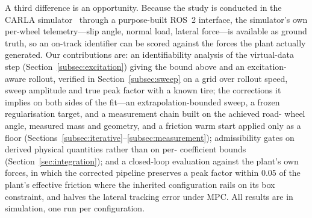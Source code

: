 A third difference is an opportunity. Because the study is conducted in the
CARLA simulator~\cite{carla2017} through a purpose-built ROS~2 interface, the
simulator's own per-wheel telemetry---slip angle, normal load, lateral
force---is available as ground truth, so an on-track identifier can be scored
against the forces the plant actually generated. Our contributions are: an identifiability analysis of the virtual-data step
(Section~\ref{subsec:excitation}) giving the bound above and an excitation-
aware rollout, verified in Section~\ref{subsec:sweep} on a grid over rollout
speed, sweep amplitude and true peak factor with a known tire; the corrections
it implies on both sides of the fit---an extrapolation-bounded sweep, a frozen
regularisation target, and a measurement chain built on the achieved road-
wheel angle, measured mass and geometry, and a friction warm start applied
only as a floor (Sections~\ref{subsec:iterative}--\ref{subsec:measurement});
admissibility gates on derived physical quantities rather than on per-
coefficient bounds (Section~\ref{sec:integration}); and a closed-loop
evaluation against the plant's own forces, in which the corrected pipeline
preserves a peak factor within \num{0.05} of the plant's effective friction
where the inherited configuration rails on its box constraint, and halves the
lateral tracking error under MPC. All results are in simulation, one run per
configuration.
